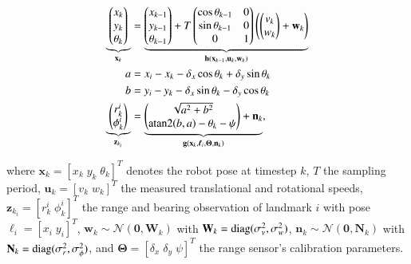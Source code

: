 \begin{equation}\label{eqn:exp_model}
  \begin{aligned}
  \underbrace {
  \begin{pmatrix}
  x_k\\
  y_k\\
  \theta_k
  \end{pmatrix}}_{\mathbf{x}_k}&=
  \underbrace{
  \begin{pmatrix}
  x_{k-1}\\
  y_{k-1}\\
  \theta_{k-1}
  \end{pmatrix} + T
  \begin{pmatrix}
  \cos\theta_{k-1}&0\\
  \sin\theta_{k-1}&0\\
  0&1
  \end{pmatrix}
  \left(\begin{pmatrix}
  v_k\\
  w_k
  \end{pmatrix}
  + \mathbf{w}_k\right)
  }_{\mathbf{h}(\mathbf{x}_{k-1}, \mathbf{u}_k, \mathbf{w}_k)}\\
  a &= x_i - x_k - \delta_x\cos\theta_k + \delta_y\sin\theta_k\\
  b &= y_i - y_k - \delta_x\sin\theta_k - \delta_y\cos\theta_k\\
  \underbrace {
  \begin{pmatrix}
  r_k^i\\
  \phi_k^i
  \end{pmatrix} }_{\mathbf{z}_{k_i}}&=
  \underbrace {
  \begin{pmatrix}
  \sqrt{a^2 + b^2}\\
  \atan2(b, a) - \theta_k - \psi
  \end{pmatrix}
  + \mathbf{n}_k}_{\mathbf{g}(\mathbf{x}_{k}, \boldsymbol{\ell}_i,
    \boldsymbol{\Theta}, \mathbf{n}_k)},
  \end{aligned}
\end{equation}

\noindent where $\mathbf{x}_k=[x_k\;y_k\;\theta_k]^T$ denotes the robot pose at
timestep $k$, $T$ the sampling period, $\mathbf{u}_k=[v_k\;w_k]^T$ the measured
translational and rotational speeds, $\mathbf{z}_{k_i}=[r_k^i\;\phi_k^i]^T$ the
range and bearing observation of landmark $i$ with pose
$\boldsymbol{\ell}_i=[x_i\;y_i]^T$, $\mathbf{w}_k\sim\mathcal{N}(\mathbf{0},
\mathbf{W}_k)$ with $\mathbf{W}_k=\operatorname{diag}(\sigma^2_v,\sigma^2_w)$,
$\mathbf{n}_k\sim\mathcal{N}(\mathbf{0}, \mathbf{N}_k)$ with
$\mathbf{N}_k=\operatorname{diag}(\sigma^2_r,\sigma^2_\phi)$, and
$\mathbf{\Theta}=[\delta_x\;\delta_y\;\psi]^T$ the range sensor's calibration
parameters.

